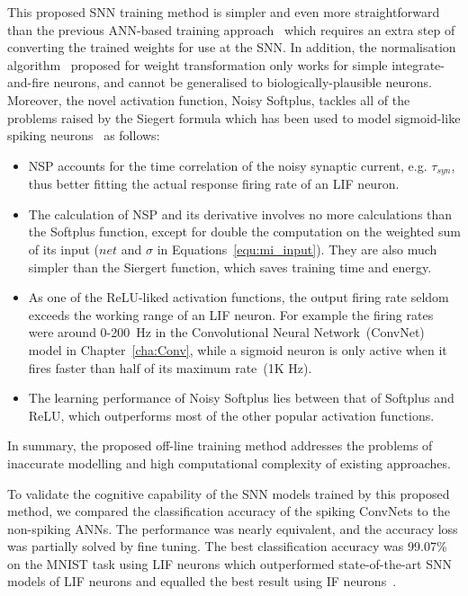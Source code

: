 This proposed SNN training method is simpler and even more straightforward than the previous ANN-based training approach~\citep{cao2015spiking,diehl2015fast} which requires an extra step of converting the trained weights for use at the SNN.
In addition, the normalisation algorithm~\citep{diehl2015fast} proposed for weight transformation only works for simple integrate-and-fire neurons, and cannot be generalised to biologically-plausible neurons.
Moreover, the novel activation function, Noisy Softplus, tackles all of the problems raised by the Siegert formula which has been used to model sigmoid-like spiking neurons~\citep{Jug_etal_2012} as follows: 
\begin{itemize}
	\item NSP accounts for the time correlation of the noisy synaptic current, e.g. $\tau_{syn}$, thus better fitting the actual response firing rate of an LIF neuron. %
	
	
	\item The calculation of NSP and its derivative involves no more calculations than the Softplus function, except for double the computation on the weighted sum of its input ($net$ and $\sigma$ in Equations~\ref{equ:mi_input}).
	They are also much simpler than the Siergert function, which saves training time and energy.
	
	\item As one of the ReLU-liked activation functions, the output firing rate seldom exceeds the working range of an LIF neuron.
	For example the firing rates were around 0-200~Hz in the Convolutional Neural Network~(ConvNet) model in Chapter~\ref{cha:Conv}, while a sigmoid neuron is only active when it fires faster than half of its maximum rate~(1K Hz).
	
	\item The learning performance of Noisy Softplus lies between that of Softplus and ReLU, which outperforms most of the other popular activation functions.
\end{itemize}
In summary, the proposed off-line training method addresses the problems of inaccurate modelling and high computational complexity of existing approaches.


To validate the cognitive capability of the SNN models trained by this proposed method, we compared the classification accuracy of the spiking ConvNets to the non-spiking ANNs.
The performance was nearly equivalent, and the accuracy loss was partially solved by fine tuning.
The best classification accuracy was 99.07\% on the MNIST task using LIF neurons which outperformed state-of-the-art SNN models of LIF neurons and equalled the best result using IF neurons~\citep{diehl2015fast}.


